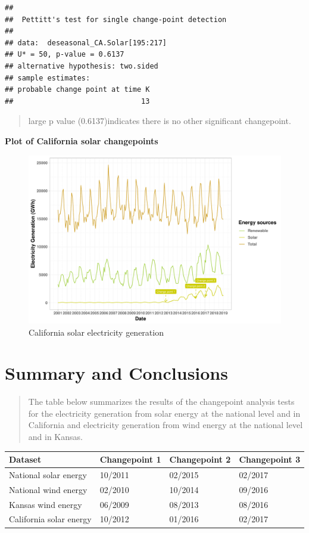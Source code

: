 \documentclass[12pt,]{article}
\begin{document}
\begin{verbatim}
## 
##  Pettitt's test for single change-point detection
## 
## data:  deseasonal_CA.Solar[195:217]
## U* = 50, p-value = 0.6137
## alternative hypothesis: two.sided
## sample estimates:
## probable change point at time K 
##                              13
\end{verbatim}

\begin{quote}
large p value (0.6137)indicates there is no other significant
changepoint.
\end{quote}

\textbf{Plot of California solar changepoints}

\begin{figure}
\centering
\includegraphics{Kara_ENV872_Project_files/figure-latex/unnamed-chunk-50-1.pdf}
\caption{California solar electricity generation}
\end{figure}

\newpage

\section{Summary and Conclusions}\label{summary-and-conclusions}

\begin{quote}
The table below summarizes the results of the changepoint analysis tests
for the electricity generation from solar energy at the national level
and in California and electricity generation from wind energy at the
national level and in Kansas.
\end{quote}

\begin{longtable}[]{@{}llll@{}}
\toprule
Dataset & Changepoint 1 & Changepoint 2 & Changepoint 3\tabularnewline
\midrule
\endhead
National solar energy & 10/2011 & 02/2015 & 02/2017\tabularnewline
National wind energy & 02/2010 & 10/2014 & 09/2016\tabularnewline
Kansas wind energy & 06/2009 & 08/2013 & 08/2016\tabularnewline
California solar energy & 10/2012 & 01/2016 & 02/2017\tabularnewline
\bottomrule
\end{longtable}
\end{document}
